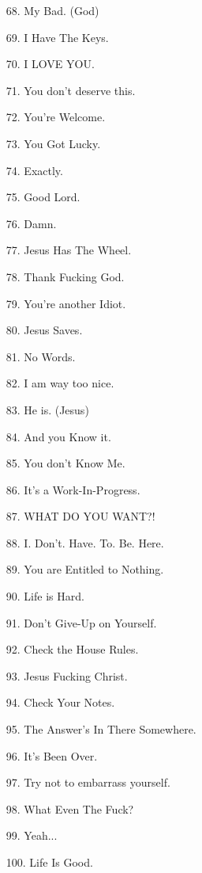 \documentclass[11pt]{article}
\begin{document}
\begin{enumerate}
	\item[68.] My Bad. (God)
	\item[69.] I Have The Keys.
	\item[70.] I LOVE YOU.
	\item[71.] You don't deserve this.
	\item[72.] You're Welcome.
	\item[73.] You Got Lucky.
	\item[74.] Exactly.
	\item[75.] Good Lord.
	\item[76.] Damn.
	\item[77.] Jesus Has The Wheel.
	\item[78.] Thank Fucking God.
	\item[79.] You're another Idiot.
	\item[80.] Jesus Saves.
	\item[81.] No Words.
	\item[82.] I am way too nice.
	\item[83.] He is. (Jesus)
	\item[84.] And you Know it.
	\item[85.] You don't Know Me.
	\item[86.] It's a Work-In-Progress.
	\item[87.] WHAT DO YOU WANT?!
	\item[88.] I. Don't. Have. To. Be. Here.
	\item[89.] You are Entitled to Nothing.
	\item[90.] Life is Hard.
	\item[91.] Don't Give-Up on Yourself.
	\item[92.] Check the House Rules.
	\item[93.] Jesus Fucking Christ.
	\item[94.] Check Your Notes.
	\item[95.] The Answer's In There Somewhere.
	\item[96.] It's Been Over.
	\item[97.] Try not to embarrass yourself.
	\item[98.] What Even The Fuck?
	\item[99.] Yeah...
	\item[100.] Life Is Good.
	
\end{enumerate}
\end{document}
